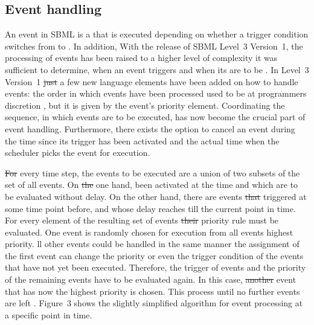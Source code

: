 \documentclass[10pt]{bmc_article}
\newenvironment{bmcformat}{\fussy\setboolean{publ}{true}}{\fussy}
\begin{document}
\begin{bmcformat}
\subsection*{Event handling}
An event in \acs{SBML} is a  that is executed depending on whether a trigger 
condition switches from \false to \true.
In addition, 
With the release of \acs{SBML} Level~3 Version~1, the processing of events has been
raised to a higher level of complexity\COR{:}
 it was sufficient to determine, when an event triggers and when its  are to be .
In Level~3 Version~1 \sout{just} a few new language elements have been
added on how to handle events:
 the order\COR{,} in which events have been processed\COR{,} used to be at programmers discretion ,
but  it is given by the event's priority element.
Coordinating the sequence, in which events are to be executed, has now become the crucial part of event handling. 
Furthermore, there exists the option to cancel an event during the time since its trigger 
has been activated and the actual time when the scheduler picks the event for execution.

\sout{For} every time step, the events to be executed are a union of two subsets of the set of all events.
On \sout{the} one hand,  been activated at the  time and which are to be evaluated without delay.
On the other hand, there are events \sout{that} triggered at some time point before, and whose delay reaches till the current point in time.
For every element of the resulting set of events\sout{ their} priority rule must be evaluated.
One event is randomly chosen for execution from all events  highest priority.
ll other events could be handled in the same manner
the assignment of the first event can change the priority or even the trigger condition of the events that have not yet been executed.
Therefore, the trigger of  events and the priority of the remaining events have to be evaluated again.
In this case, \sout{another} event that has now the highest priority is chosen.
This process  until no further events are left .
Figure~3 shows the slightly simplified algorithm for event processing at a specific point in time.


\end{bmcformat}
\end{document}

